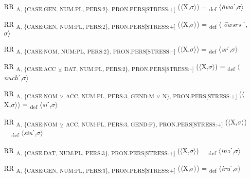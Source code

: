{\begin{exe}
 RR \textsubscript{A, \{CASE:GEN, NUM:PL, PERS:2\}, PRON.PERS[STRESS:+]} ($\langle$X,$\sigma $$\rangle$) = \textsubscript{def} $\langle$\textit{ȫwa}ˊ,$\sigma $$\rangle$
\end{exe}

\begin{exe}
 RR \textsubscript{A, \{CASE:GEN, NUM:PL, PERS:2\}, PRON.PERS[STRESS:+]} ($\langle$X,$\sigma $$\rangle$) = \textsubscript{def} $\langle$ \textit{ȫwərə} ˊ,$\sigma $$\rangle$
\end{exe}

\begin{exe}
 RR \textsubscript{A, \{CASE:NOM, NUM:PL, PERS:2\}, PRON.PERS[STRESS:–]} ($\langle$X,$\sigma $$\rangle$) = \textsubscript{def} $\langle$\textit{ər}ˊ,$\sigma $$\rangle$
\end{exe}

\begin{exe}
 RR \textsubscript{A, \{CASE:ACC} \textsubscript{${\veebar}$}\textsubscript{ DAT, NUM:PL, PERS:2\}, PRON.PERS[STRESS:–]} ($\langle$X,$\sigma $$\rangle$) = \textsubscript{def} $\langle$\textit{nuch}ˊ,$\sigma $$\rangle$
\end{exe}

\begin{exe}
 RR \textsubscript{A, \{CASE:NOM} \textsubscript{${\veebar}$}\textsubscript{ ACC, NUM:PL, PERS:3, GEND:M} \textsubscript{${\veebar}$}\textsubscript{ N\}, PRON.PERS[STRESS:+]} ($\langle$X,$\sigma $$\rangle$) = \textsubscript{def} $\langle$\textit{si}ˊ,$\sigma $$\rangle$
\end{exe}

\begin{exe}
 RR \textsubscript{A, \{CASE:NOM} \textsubscript{${\veebar}$}\textsubscript{ ACC, NUM:PL, PERS:3, GEND:F\}, PRON.PERS[STRESS:+]} ($\langle$X,$\sigma $$\rangle$) = \textsubscript{def} $\langle$\textit{siu}ˊ,$\sigma $$\rangle$
\end{exe}

\begin{exe}
 RR \textsubscript{A, \{CASE:DAT, NUM:PL, PERS:3\}, PRON.PERS[STRESS:+]} ($\langle$X,$\sigma $$\rangle$) = \textsubscript{def} $\langle$\textit{inə}ˊ,$\sigma $$\rangle$
\end{exe}

\begin{exe}
 RR \textsubscript{A, \{CASE:GEN, NUM:PL, PERS:3\}, PRON.PERS[STRESS:+]} ($\langle$X,$\sigma $$\rangle$) = \textsubscript{def} $\langle$\textit{iru}ˊ,$\sigma $$\rangle$
\end{exe}

}
